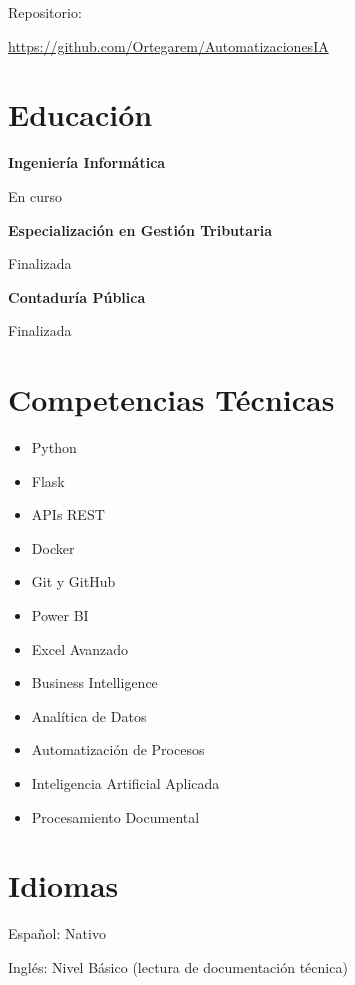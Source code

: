 \documentclass[11pt,a4paper]{article}
\begin{document}
Repositorio:

\url{https://github.com/Ortegarem/AutomatizacionesIA}

\section*{Educación}

\textbf{Ingeniería Informática}

En curso

\vspace{0.2cm}

\textbf{Especialización en Gestión Tributaria}

Finalizada

\vspace{0.2cm}

\textbf{Contaduría Pública}

Finalizada

\section*{Competencias Técnicas}

\begin{itemize}[leftmargin=*]
\item Python
\item Flask
\item APIs REST
\item Docker
\item Git y GitHub
\item Power BI
\item Excel Avanzado
\item Business Intelligence
\item Analítica de Datos
\item Automatización de Procesos
\item Inteligencia Artificial Aplicada
\item Procesamiento Documental
\end{itemize}

\section*{Idiomas}

Español: Nativo

Inglés: Nivel Básico (lectura de documentación técnica)
\end{document}
